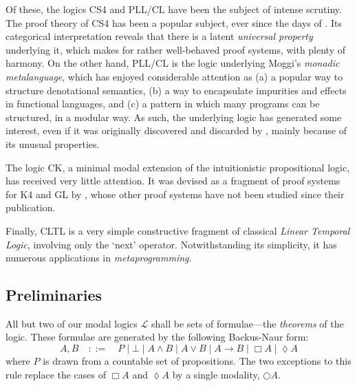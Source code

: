 \documentclass[a4paper]{amsart}
\begin{document}
Of these, the logics \textsf{CS4} and \textsf{PLL}/\textsf{CL}
have been the subject of intense scrutiny. The proof theory of
\textsf{CS4} has been a popular subject, ever since the days of
\cite{Prawitz1965}. Its categorical interpretation reveals that
there is a latent \emph{universal property} underlying it, which
makes for rather well-behaved proof systems, with plenty of
harmony. On the other hand, \textsf{PLL}/\textsf{CL} is the logic
underlying Moggi's \emph{monadic metalanguage}, which has
enjoyed considerable attention as (a) a popular way to structure
denotational semantics, (b) a way to encapsulate impurities and
effects in functional languages, and (c) a pattern in which many
programs can be structured, in a modular way. As such, the
underlying logic has generated some interest, even if it was
originally discovered and discarded by \cite{Curry1952}, mainly
because of its unusual properties.

The logic \textsf{CK}, a minimal modal extension of the
intuitionistic propositional logic, has received very little
attention. It was devised as a fragment of proof systems for
\textsf{K4} and \textsf{GL} by \cite{Bellin1985}, whose other
proof systems have not been studied since their publication.

Finally, \textsf{CLTL} is a very simple constructive fragment of
classical \emph{Linear Temporal Logic}, involving only the `next'
operator. Notwithstanding its simplicity, it has numerous
applications in \emph{metaprogramming}.

\subsection{Preliminaries}

All but two of our modal logics $\mathcal{L}$ shall be sets of
formulae---the \emph{theorems} of the logic. These formulae are
generated by the following Backus-Naur form: \[
  A, B \quad ::=\quad P
    \;|\; \bot
    \;|\; A \land B
    \;|\; A \lor B
    \;|\; A \rightarrow B 
    \;|\; \Box A
    \;|\; \lozenge A
\] where $P$ is drawn from a countable set of propositions. The
two exceptions to this rule replace the cases of $\Box A$ and
$\lozenge A$ by a single modality, $\bigcirc A$.
\end{document}
